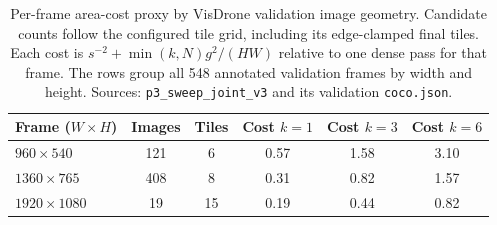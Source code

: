 \begin{table}[t]
\caption{Per-frame area-cost proxy by VisDrone validation image geometry. Candidate counts follow the configured tile grid, including its edge-clamped final tiles. Each cost is $s^{-2}+\min(k,N)g^2/(HW)$ relative to one dense pass for that frame. The rows group all 548 annotated validation frames by width and height. Sources: \texttt{p3\_sweep\_joint\_v3} and its validation \texttt{coco.json}.}
\label{tab:frame-cost}
\centering
\begin{tabular}{lccccc}
\toprule
Frame ($W\times H$) & Images & Tiles & Cost $k{=}1$ & Cost $k{=}3$ & Cost $k{=}6$ \\
\midrule
$960\times540$ & 121 & 6 & 0.57 & 1.58 & 3.10 \\
$1360\times765$ & 408 & 8 & 0.31 & 0.82 & 1.57 \\
$1920\times1080$ & 19 & 15 & 0.19 & 0.44 & 0.82 \\
\bottomrule
\end{tabular}
\end{table}

